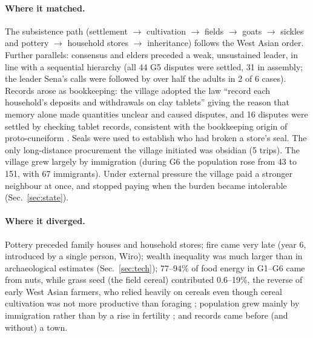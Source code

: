 \documentclass[11pt]{article}
\begin{document}
\paragraph{Where it matched.} The subsistence path (settlement $\rightarrow$ cultivation $\rightarrow$ fields $\rightarrow$ goats $\rightarrow$ sickles and pottery $\rightarrow$ household stores $\rightarrow$ inheritance) follows the West Asian order. Further parallels: consensus and elders preceded a weak, unsustained leader, in line with a sequential hierarchy \citep{johnson1982scalar} (all 44 G5 disputes were settled, 31 in assembly; the leader Sena's calls were followed by over half the adults in 2 of 6 cases). Records arose as bookkeeping: the village adopted the law ``record each household's deposits and withdrawals on clay tablets'' giving the reason that memory alone made quantities unclear and caused disputes, and 16 disputes were settled by checking tablet records, consistent with the bookkeeping origin of proto-cuneiform \citep{englund2011accounting,schmandt1992before}. Seals were used to establish who had broken a store's seal. The only long-distance procurement the village initiated was obsidian (5 trips). The village grew largely by immigration (during G6 the population rose from 43 to 151, with 67 immigrants). Under external pressure the village paid a stronger neighbour at once, and stopped paying when the burden became intolerable (Sec.~\ref{sec:state}).

\paragraph{Where it diverged.} Pottery preceded family houses and household stores; fire came very late (year 6, introduced by a single person, Wiro); wealth inequality was much larger than in archaeological estimates (Sec.~\ref{sec:tech}); 77--94\% of food energy in G1--G6 came from nuts, while grass seed (the field cereal) contributed 0.6--19\%, the reverse of early West Asian farmers, who relied heavily on cereals even though cereal cultivation was not more productive than foraging \citep{bowles2011cultivation}; population grew mainly by immigration rather than by a rise in fertility \citep{bocquetappel2002paleo}; and records came before (and without) a town.
\end{document}
